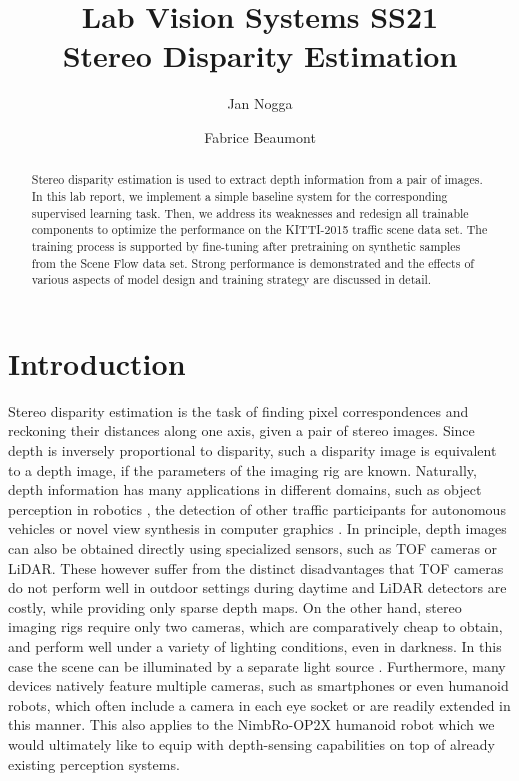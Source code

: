 \documentclass[runningheads]{llncs}
\begin{document}
%
\title{Lab Vision Systems SS21 \\Stereo Disparity Estimation}
%
%
\author{Jan Nogga \and
Fabrice Beaumont}
%
%
%
\maketitle              %
%
\begin{abstract}
Stereo disparity estimation is used to extract depth information from a pair of images.
In this lab report, we implement a simple baseline system for the corresponding supervised learning task. Then, we address its weaknesses and redesign all trainable components to optimize the performance on the KITTI-2015 traffic scene data set. The training process is supported by fine-tuning after pretraining on synthetic samples from the Scene Flow data set. Strong performance is demonstrated and the effects of various aspects of model design and training strategy are discussed in detail.
\end{abstract}
%
%
%


\section{Introduction}
Stereo disparity estimation is the task of finding pixel correspondences and reckoning their distances along one axis, given a pair of stereo images. Since depth is inversely proportional to disparity, such a disparity image is equivalent to a depth image, if the parameters of the imaging rig are known. Naturally, depth information has many applications in different domains, such as object perception in robotics \cite{Object_Perception}, the detection of other traffic participants for autonomous vehicles \cite{Vehicle_Perception} or novel view synthesis in computer graphics \cite{View_Synthesis}. In principle, depth images can also be obtained directly using specialized sensors, such as TOF cameras or LiDAR. These however suffer from the distinct disadvantages that TOF cameras do not perform well in outdoor settings during daytime and LiDAR detectors are costly, while providing only sparse depth maps. On the other hand, stereo imaging rigs require only two cameras, which are comparatively cheap to obtain, and perform well under a variety of lighting conditions, even in darkness. In this case the scene can be illuminated by a separate light source \cite{Light_Source}. Furthermore, many devices natively feature multiple cameras, such as smartphones or even humanoid robots, which often include a camera in each eye socket or are readily extended in this manner. This also applies to the NimbRo-OP2X humanoid robot \cite{NimbRo-OP2X} which we would ultimately like to equip with depth-sensing capabilities on top of already existing perception systems.
\end{document}
